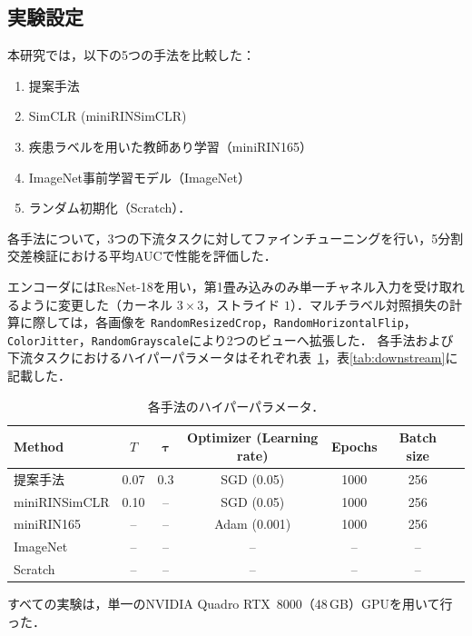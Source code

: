 \subsection{実験設定}
本研究では，以下の5つの手法を比較した：
\begin{enumerate}
  \item 提案手法
  \item SimCLR \cite{chen2020simple} (miniRINSimCLR)
  \item 疾患ラベルを用いた教師あり学習（miniRIN165）
  \item ImageNet事前学習モデル（ImageNet）
  \item ランダム初期化（Scratch）．
\end{enumerate}

各手法について，3つの下流タスクに対してファインチューニングを行い，5分割交差検証における平均AUCで性能を評価した．

エンコーダにはResNet-18を用い，第1畳み込みのみ単一チャネル入力を受け取れるように変更した（カーネル $3{\times}3$，ストライド $1$）．マルチラベル対照損失の計算に際しては，各画像を \texttt{RandomResizedCrop}，\texttt{RandomHorizontalFlip}，\texttt{ColorJitter}，\texttt{RandomGrayscale}により2つのビューへ拡張した．
各手法および下流タスクにおけるハイパーパラメータはそれぞれ表~\ref{tab:pretrain}，表\ref{tab:downstream}に記載した．
\begin{table}[t]
  \centering
  \caption{各手法のハイパーパラメータ．}
  \label{tab:pretrain}
  \small
  \begin{tabular}{lcccccc}
    \toprule
    \textbf{Method}  & \textbf{$T$} & $\boldsymbol{\tau}$ &
    \textbf{Optimizer (Learning rate)} & \textbf{Epochs} & \textbf{Batch size} \\
    \midrule
    提案手法  & 0.07 & 0.3 & SGD (0.05) & 1000 & 256 \\
    miniRINSimCLR               & 0.10 & –   & SGD (0.05) & 1000 & 256 \\
    miniRIN165            & –    & –   & Adam (0.001)               & 1000 & 256 \\
    ImageNet             & –    & –   & –                             & –    & –   \\
    Scratch          & –                     & –   & –                             & –    & –   \\
    \bottomrule
  \end{tabular}
\end{table}

すべての実験は，単一のNVIDIA Quadro RTX~8000（48\,GB）GPUを用いて行った．



